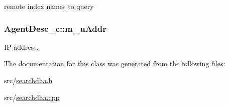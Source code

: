 remote index names to query 

\hypertarget{classAgentDesc__c_a9f0f231fa4e195fb60e1ff31d39a9f9b}{
\subsubsection[{m\-\_\-u\-Addr}]{ Agent\-Desc\-\_\-c\-::m\-\_\-u\-Addr}}\label{classAgentDesc__c_a9f0f231fa4e195fb60e1ff31d39a9f9b}


I\-P address. 



The documentation for this class was generated from the following files\-:\begin{DoxyCompactItemize}
\item 
src/\hyperlink{searchdha_8h}{searchdha.\-h}\item 
src/\hyperlink{searchdha_8cpp}{searchdha.\-cpp}\end{DoxyCompactItemize}
